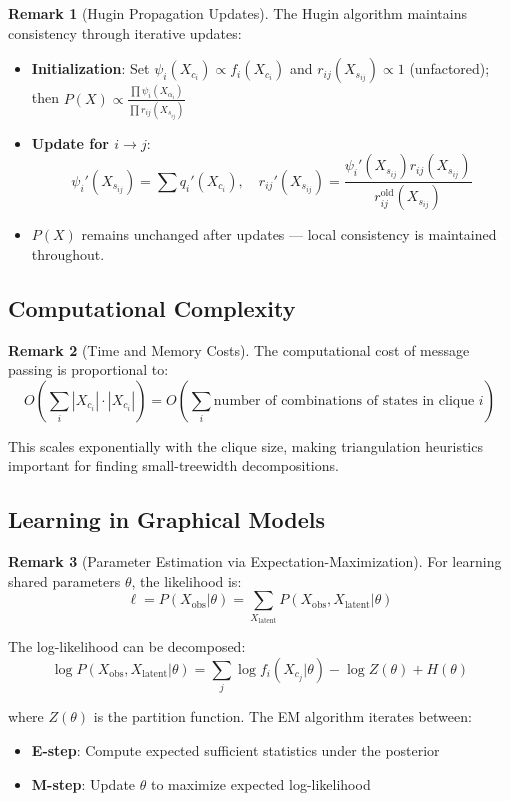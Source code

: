 \documentclass[12pt,a4paper]{article}
\theoremstyle{definition}
\newtheorem{remark}{Remark}[section]
\begin{document}
\begin{remark}[Hugin Propagation Updates]
The Hugin algorithm maintains consistency through iterative updates:

\begin{itemize}
    \item \textbf{Initialization}: Set $\psi_i(X_{c_i}) \propto f_i(X_{c_i})$ and $r_{ij}(X_{s_{ij}}) \propto 1$ (unfactored); then $P(X) \propto \frac{\prod \psi_i(X_{\alpha_i})}{\prod r_{ij}(X_{s_{ij}})}$
    
    \item \textbf{Update for $i \to j$}: 
    \[
    \psi_i'(X_{s_{ij}}) = \sum q_i'(X_{c_i}), \quad r_{ij}'(X_{s_{ij}}) = \frac{\psi_i'(X_{s_{ij}}) r_{ij}(X_{s_{ij}})}{r_{ij}^{\text{old}}(X_{s_{ij}})}
    \]
    
    \item $P(X)$ remains unchanged after updates — local consistency is maintained throughout.
\end{itemize}
\end{remark}

\subsection{Computational Complexity}

\begin{remark}[Time and Memory Costs]
The computational cost of message passing is proportional to:
\[
O\left(\sum_i |X_{c_i}| \cdot |X_{c_i}|\right) = O\left(\sum_i \text{number of combinations of states in clique } i\right)
\]

This scales exponentially with the clique size, making triangulation heuristics important for finding small-treewidth decompositions.
\end{remark}

\subsection{Learning in Graphical Models}

\begin{remark}[Parameter Estimation via Expectation-Maximization]
For learning shared parameters $\theta$, the likelihood is:
\[
\ell = P(X_{\text{obs}} | \theta) = \sum_{X_{\text{latent}}} P(X_{\text{obs}}, X_{\text{latent}} | \theta)
\]

The log-likelihood can be decomposed:
\[
\log P(X_{\text{obs}}, X_{\text{latent}} | \theta) = \sum_j \log f_i(X_{c_j} | \theta) - \log Z(\theta) + H(\theta)
\]

where $Z(\theta)$ is the partition function. The EM algorithm iterates between:
\begin{itemize}
    \item \textbf{E-step}: Compute expected sufficient statistics under the posterior
    \item \textbf{M-step}: Update $\theta$ to maximize expected log-likelihood
\end{itemize}
\end{remark}
\end{document}
